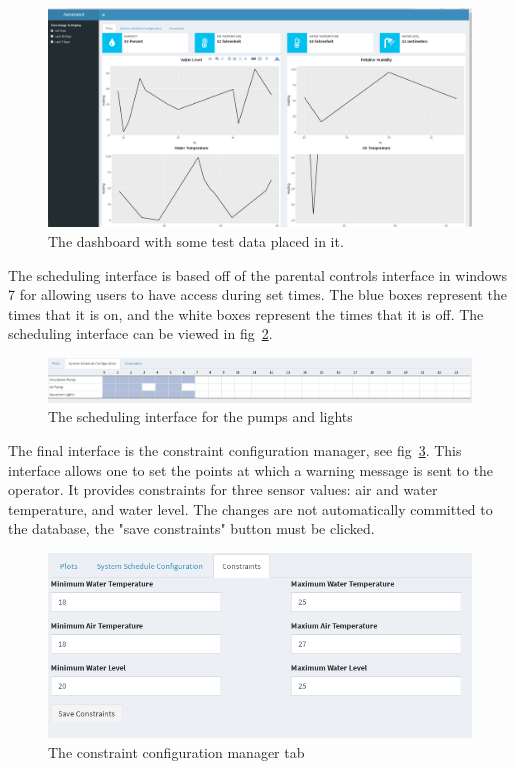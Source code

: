 \documentclass[american,12pt]{article}
\begin{document}
\begin{figure}[h]
	\includegraphics[width=\linewidth]{imgs/WebappDashboard}
	\caption{The dashboard with some test data placed in it.}
	\label{fig:data dashboard}
\end{figure}

The scheduling interface is based off of the parental controls interface
in windows 7 for allowing users to have access during set times. The blue
boxes represent the times that it is on, and the white boxes represent the
times that it is off. The scheduling interface can be viewed in
fig~\ref{fig:schedular}.

\begin{figure}[h]
	\includegraphics[width=\linewidth]{imgs/sched}
	\caption{The scheduling interface for the pumps and lights}
	\label{fig:schedular}
\end{figure}

The final interface is the constraint configuration manager,
see fig~\ref{fig:constraints}. 
This interface allows
one to set the points at which a warning message is sent to the operator.
It provides constraints for three sensor values: air and water temperature,
and water level. The changes are not automatically committed to the database,
the "save constraints" button must be clicked.

\begin{figure}[h]
	\includegraphics[width=\linewidth]{imgs/constraints}
	\caption{The constraint configuration manager tab}
	\label{fig:constraints}
\end{figure}
\end{document}
